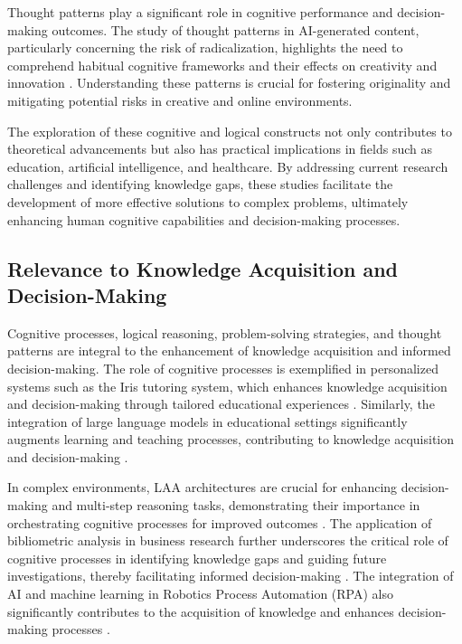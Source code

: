 Thought patterns play a significant role in cognitive performance and decision-making outcomes. The study of thought patterns in AI-generated content, particularly concerning the risk of radicalization, highlights the need to comprehend habitual cognitive frameworks and their effects on creativity and innovation \cite{yamshchikov2020styletransferparaphraselookingsensible}. Understanding these patterns is crucial for fostering originality and mitigating potential risks in creative and online environments.



The exploration of these cognitive and logical constructs not only contributes to theoretical advancements but also has practical implications in fields such as education, artificial intelligence, and healthcare. By addressing current research challenges and identifying knowledge gaps, these studies facilitate the development of more effective solutions to complex problems, ultimately enhancing human cognitive capabilities and decision-making processes.



\subsection{Relevance to Knowledge Acquisition and Decision-Making} \label{subsec:Relevance to Knowledge Acquisition and Decision-Making}

Cognitive processes, logical reasoning, problem-solving strategies, and thought patterns are integral to the enhancement of knowledge acquisition and informed decision-making. The role of cognitive processes is exemplified in personalized systems such as the Iris tutoring system, which enhances knowledge acquisition and decision-making through tailored educational experiences \cite{bassner2024irisaidrivenvirtualtutor}. Similarly, the integration of large language models in educational settings significantly augments learning and teaching processes, contributing to knowledge acquisition and decision-making \cite{kasneci2023chatgpt}. 



In complex environments, LAA architectures are crucial for enhancing decision-making and multi-step reasoning tasks, demonstrating their importance in orchestrating cognitive processes for improved outcomes \cite{liu2023bolaabenchmarkingorchestratingllmaugmented}. The application of bibliometric analysis in business research further underscores the critical role of cognitive processes in identifying knowledge gaps and guiding future investigations, thereby facilitating informed decision-making \cite{Contentsli1}. The integration of AI and machine learning in Robotics Process Automation (RPA) also significantly contributes to the acquisition of knowledge and enhances decision-making processes \cite{pandy2024advancementsroboticsprocessautomation}.



